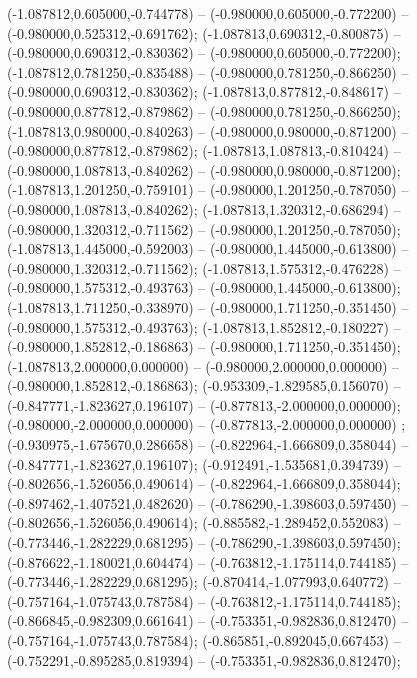  (-1.087812,0.605000,-0.744778) -- (-0.980000,0.605000,-0.772200) -- (-0.980000,0.525312,-0.691762);
 (-1.087813,0.690312,-0.800875) -- (-0.980000,0.690312,-0.830362) -- (-0.980000,0.605000,-0.772200);
 (-1.087812,0.781250,-0.835488) -- (-0.980000,0.781250,-0.866250) -- (-0.980000,0.690312,-0.830362);
 (-1.087813,0.877812,-0.848617) -- (-0.980000,0.877812,-0.879862) -- (-0.980000,0.781250,-0.866250);
 (-1.087813,0.980000,-0.840263) -- (-0.980000,0.980000,-0.871200) -- (-0.980000,0.877812,-0.879862);
 (-1.087813,1.087813,-0.810424) -- (-0.980000,1.087813,-0.840262) -- (-0.980000,0.980000,-0.871200);
 (-1.087813,1.201250,-0.759101) -- (-0.980000,1.201250,-0.787050) -- (-0.980000,1.087813,-0.840262);
 (-1.087813,1.320312,-0.686294) -- (-0.980000,1.320312,-0.711562) -- (-0.980000,1.201250,-0.787050);
 (-1.087813,1.445000,-0.592003) -- (-0.980000,1.445000,-0.613800) -- (-0.980000,1.320312,-0.711562);
 (-1.087813,1.575312,-0.476228) -- (-0.980000,1.575312,-0.493763) -- (-0.980000,1.445000,-0.613800);
 (-1.087813,1.711250,-0.338970) -- (-0.980000,1.711250,-0.351450) -- (-0.980000,1.575312,-0.493763);
 (-1.087813,1.852812,-0.180227) -- (-0.980000,1.852812,-0.186863) -- (-0.980000,1.711250,-0.351450);
 (-1.087813,2.000000,0.000000) -- (-0.980000,2.000000,0.000000) -- (-0.980000,1.852812,-0.186863);
 (-0.953309,-1.829585,0.156070) -- (-0.847771,-1.823627,0.196107) -- (-0.877813,-2.000000,0.000000);
 (-0.980000,-2.000000,0.000000) -- (-0.877813,-2.000000,0.000000) ;
 (-0.930975,-1.675670,0.286658) -- (-0.822964,-1.666809,0.358044) -- (-0.847771,-1.823627,0.196107);
 (-0.912491,-1.535681,0.394739) -- (-0.802656,-1.526056,0.490614) -- (-0.822964,-1.666809,0.358044);
 (-0.897462,-1.407521,0.482620) -- (-0.786290,-1.398603,0.597450) -- (-0.802656,-1.526056,0.490614);
 (-0.885582,-1.289452,0.552083) -- (-0.773446,-1.282229,0.681295) -- (-0.786290,-1.398603,0.597450);
 (-0.876622,-1.180021,0.604474) -- (-0.763812,-1.175114,0.744185) -- (-0.773446,-1.282229,0.681295);
 (-0.870414,-1.077993,0.640772) -- (-0.757164,-1.075743,0.787584) -- (-0.763812,-1.175114,0.744185);
 (-0.866845,-0.982309,0.661641) -- (-0.753351,-0.982836,0.812470) -- (-0.757164,-1.075743,0.787584);
 (-0.865851,-0.892045,0.667453) -- (-0.752291,-0.895285,0.819394) -- (-0.753351,-0.982836,0.812470);
